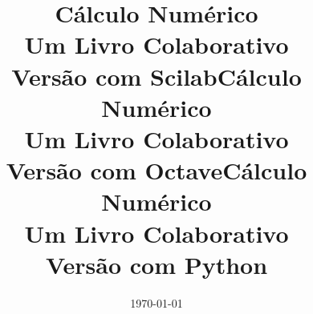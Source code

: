 \documentclass[12pt]{book}
\begin{document}
\frontmatter

\ifisscilab
\title{Cálculo Numérico\\\small{Um Livro Colaborativo}\\\small{Versão com Scilab}}
\fi
\ifisoctave
\title{Cálculo Numérico\\\small{Um Livro Colaborativo}\\\small{Versão com Octave}}
\fi
\ifispython
\title{Cálculo Numérico\\\small{Um Livro Colaborativo}\\\small{Versão com Python}}
\fi
\author{}
\date{\today}
\ifishtml
\else
{}
\fi

\ifishtml
\else
\AddToShipoutPicture*{\BackgroundPic}
\fi
\maketitle






\ifisslide
\tableofcontents
\else
\ifishtml
\else
\tableofcontents
{}
\fi
\fi

\mainmatter







%




%

%




%
%




\ifisscilab
\appendix



\fi
\ifispython
\appendix



\fi

\ifishtml
\else



\shipoutAnswer  
\fi

\nocite{*}




\ifishtml
\else
\clearpage
{}
\printindex
\fi
\end{document}
